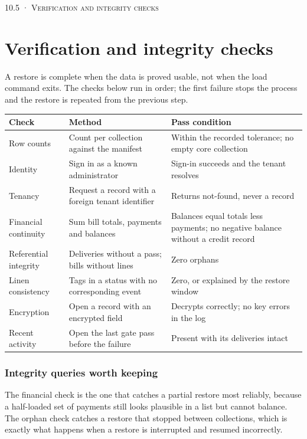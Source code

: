 \documentclass[11pt,a4paper,oneside]{book}
\begin{document}
\textsc{\small\color{crimson}10.5 · Verification and integrity checks}\par\medskip
\section*{Verification and integrity checks}
A restore is complete when the data is proved usable, not when the load command exits. The checks below run in order; the first failure stops the process and the restore is repeated from the previous step.

\begin{center}\small
\begin{tabularx}{\linewidth}{|X|X|X|}
\hline
\rowcolor{lightgrey}
\textbf{Check} & \textbf{Method} & \textbf{Pass condition} \\ \hline
Row counts & Count per collection against the manifest & Within the recorded tolerance; no empty core collection \\ \hline
Identity & Sign in as a known administrator & Sign-in succeeds and the tenant resolves \\ \hline
Tenancy & Request a record with a foreign tenant identifier & Returns not-found, never a record \\ \hline
Financial continuity & Sum bill totals, payments and balances & Balances equal totals less payments; no negative balance without a credit record \\ \hline
Referential integrity & Deliveries without a pass; bills without lines & Zero orphans \\ \hline
Linen consistency & Tags in a status with no corresponding event & Zero, or explained by the restore window \\ \hline
Encryption & Open a record with an encrypted field & Decrypts correctly; no key errors in the log \\ \hline
Recent activity & Open the last gate pass before the failure & Present with its deliveries intact \\ \hline
\end{tabularx}
\end{center}
\subsubsection*{Integrity queries worth keeping}
The financial check is the one that catches a partial restore most reliably, because a half-loaded set of payments still looks plausible in a list but cannot balance. The orphan check catches a restore that stopped between collections, which is exactly what happens when a restore is interrupted and resumed incorrectly.
\end{document}
